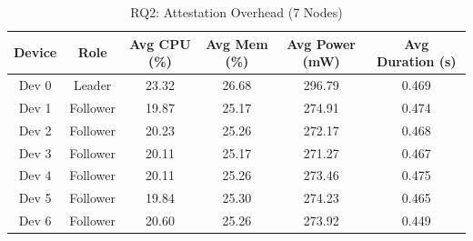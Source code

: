 \begin{table}[htbp]
\centering
\caption{RQ2: Attestation Overhead (7 Nodes)}
\label{tab:RQ2-Device-Overhead-7Nodes-Attestation-table}
\begin{tabular}{|c|c|c|c|c|c|}
\hline
\textbf{Device} & \textbf{Role} & \textbf{Avg CPU (\%)} & \textbf{Avg Mem (\%)} & \textbf{Avg Power (mW)} & \textbf{Avg Duration (s)} \\
\hline
Dev 0 & Leader & 23.32 & 26.68 & 296.79 & 0.469 \\
\hline
Dev 1 & Follower & 19.87 & 25.17 & 274.91 & 0.474 \\
\hline
Dev 2 & Follower & 20.23 & 25.26 & 272.17 & 0.468 \\
\hline
Dev 3 & Follower & 20.11 & 25.17 & 271.27 & 0.467 \\
\hline
Dev 4 & Follower & 20.11 & 25.26 & 273.46 & 0.475 \\
\hline
Dev 5 & Follower & 19.84 & 25.30 & 274.23 & 0.465 \\
\hline
Dev 6 & Follower & 20.60 & 25.26 & 273.92 & 0.449 \\
\hline
\end{tabular}
\end{table}
